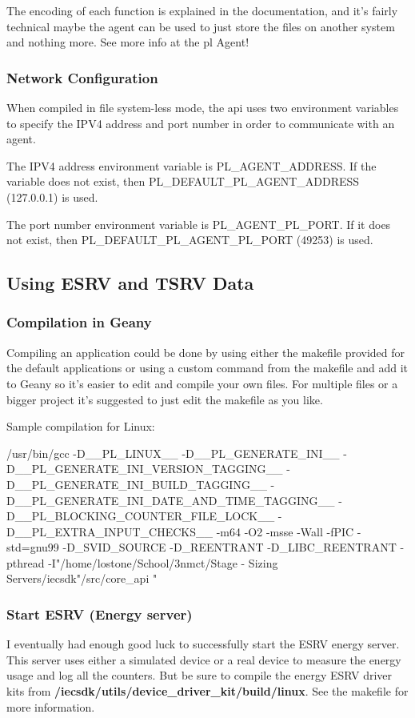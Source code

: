 The encoding of each function is explained in the documentation, and it's fairly technical maybe the agent can be used to just store the files on another system and nothing more. See more info at the \gls{pl} Agent!
\subsubsection{Network Configuration}
When compiled in file system-less mode, the \gls{api} uses two environment variables to specify the IPV4 address and port number in order to communicate with an agent.

The IPV4 address environment variable is PL\_AGENT\_ADDRESS. If the variable does not exist, then PL\_DEFAULT\_PL\_AGENT\_ADDRESS (127.0.0.1)  is used.

The port number environment variable is PL\_AGENT\_PL\_PORT. If it does not exist, then PL\_DEFAULT\_PL\_AGENT\_PL\_PORT (49253)  is used.
\subsection{Using ESRV and TSRV Data}
\subsubsection{Compilation in Geany}
Compiling an application could be done by using either the \gls{makefile} provided for the default applications or using a custom command from the \gls{makefile} and add it to Geany so it's easier to edit and compile your own files. For multiple files or a bigger project it's suggested to just edit the \gls{makefile} as you like.

Sample compilation for Linux:
\begin{codelisting}
	/usr/bin/gcc -D__PL_LINUX__ -D__PL_GENERATE_INI__ -D__PL_GENERATE_INI_VERSION_TAGGING__ -D__PL_GENERATE_INI_BUILD_TAGGING__ -D__PL_GENERATE_INI_DATE_AND_TIME_TAGGING__ -D__PL_BLOCKING_COUNTER_FILE_LOCK__ -D__PL_EXTRA_INPUT_CHECKS__ -m64  -O2 -msse -Wall -fPIC -std=gnu99 -D_SVID_SOURCE -D_REENTRANT -D_LIBC_REENTRANT -pthread	-I"/home/lostone/School/3nmct/Stage - Sizing Servers/iecsdk"/src/core_api "%
\end{codelisting}
\subsubsection{Start ESRV (Energy server)}
I eventually had enough good luck to successfully start the ESRV energy server. This server uses either a simulated device or a real device to measure the energy usage and log all the counters. But be sure to compile the energy ESRV driver kits from \textbf{/iecsdk/utils/device\_driver\_kit/build/linux}. See the \gls{makefile} for more information.

